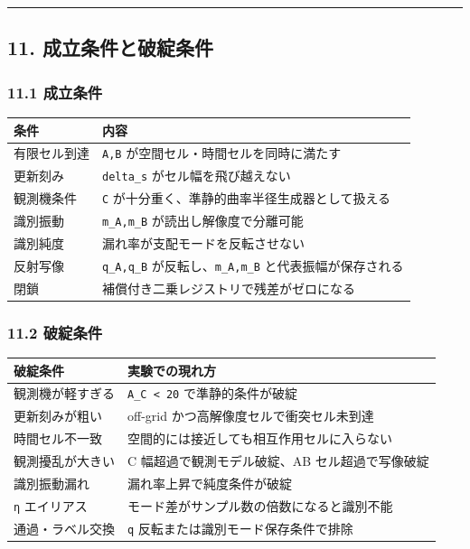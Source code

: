 \documentclass[
  a4paper,
]{article}
\newcounter{none} %
\begin{document}
\begin{center}\rule{0.5\linewidth}{0.5pt}\end{center}

\subsection{11.
成立条件と破綻条件}\label{ux6210ux7acbux6761ux4ef6ux3068ux7834ux7dbbux6761ux4ef6}

\subsubsection{11.1 成立条件}\label{ux6210ux7acbux6761ux4ef6}

{\def\LTcaptype{none} %
\begin{longtable}[]{@{}ll@{}}
\toprule\noalign{}
条件 & 内容 \\
\midrule\noalign{}
\endhead
\bottomrule\noalign{}
\endlastfoot
有限セル到達 & \texttt{A,B} が空間セル・時間セルを同時に満たす \\
更新刻み & \texttt{delta\_s} がセル幅を飛び越えない \\
観測機条件 & \texttt{C} が十分重く、準静的曲率半径生成器として扱える \\
識別振動 & \texttt{m\_A,m\_B} が読出し解像度で分離可能 \\
識別純度 & 漏れ率が支配モードを反転させない \\
反射写像 & \texttt{q\_A,q\_B} が反転し、\texttt{m\_A,m\_B}
と代表振幅が保存される \\
閉鎖 & 補償付き二乗レジストリで残差がゼロになる \\
\end{longtable}
}

\subsubsection{11.2 破綻条件}\label{ux7834ux7dbbux6761ux4ef6}

{\def\LTcaptype{none} %
\begin{longtable}[]{@{}ll@{}}
\toprule\noalign{}
破綻条件 & 実験での現れ方 \\
\midrule\noalign{}
\endhead
\bottomrule\noalign{}
\endlastfoot
観測機が軽すぎる & \texttt{A\_C\ \textless{}\ 20} で準静的条件が破綻 \\
更新刻みが粗い & off-grid かつ高解像度セルで衝突セル未到達 \\
時間セル不一致 & 空間的には接近しても相互作用セルに入らない \\
観測擾乱が大きい & C 幅超過で観測モデル破綻、AB セル超過で写像破綻 \\
識別振動漏れ & 漏れ率上昇で純度条件が破綻 \\
\texttt{η} エイリアス & モード差がサンプル数の倍数になると識別不能 \\
通過・ラベル交換 & \texttt{q} 反転または識別モード保存条件で排除 \\
\end{longtable}
}
\end{document}
